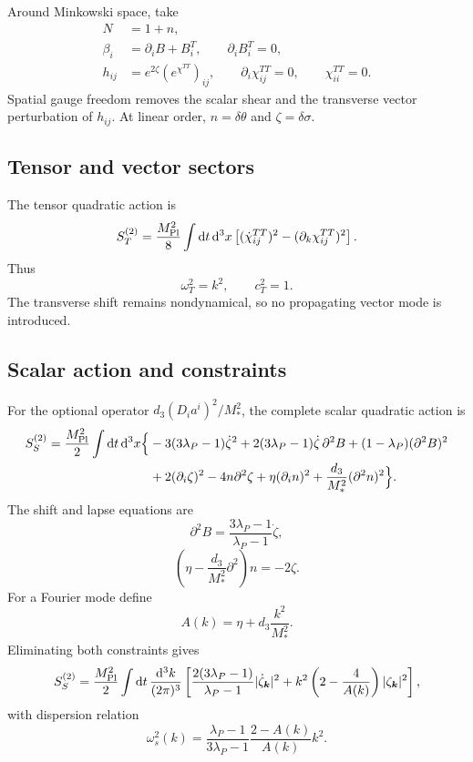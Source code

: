 \documentclass[11pt]{article}
\newcommand{\Mpl}{M_{\rm Pl}}
\newcommand{\Ms}{M_*}
\newcommand{\dd}{\mathrm{d}}
\begin{document}
Around Minkowski space, take
\begin{align}
N&=1+n,\nonumber\\
\beta_i&=\partial_iB+B_i^T,\qquad \partial_iB_i^T=0,\nonumber\\
h_{ij}&=e^{2\zeta}(e^{\chi^{TT}})_{ij},\qquad
\partial_i\chi_{ij}^{TT}=0,\qquad \chi_{ii}^{TT}=0.
\label{eq:decomp}
\end{align}
Spatial gauge freedom removes the scalar shear and the transverse vector perturbation of $h_{ij}$.  At linear order, $n=\delta\theta$ and $\zeta=\delta\sigma$.

\subsection{Tensor and vector sectors}

The tensor quadratic action is
\begin{equation}
S_T^{(2)}=\frac{\Mpl^2}{8}\int \dd t\,\dd^3x
\left[(\dot\chi_{ij}^{TT})^2-(\partial_k\chi_{ij}^{TT})^2\right].
\label{eq:tensorquad}
\end{equation}
Thus
\begin{equation}
\omega_T^2=k^2,
\qquad c_T^2=1.
\end{equation}
The transverse shift remains nondynamical, so no propagating vector mode is introduced.

\subsection{Scalar action and constraints}

For the optional operator $d_3(D_i a^i)^2/\Ms^2$, the complete scalar quadratic action is
\begin{align}
S_S^{(2)}=\frac{\Mpl^2}{2}\int \dd t\,\dd^3x\Big\{&
-3(3\lambda_P-1)\dot\zeta^2
+2(3\lambda_P-1)\dot\zeta\,\partial^2B
+(1-\lambda_P)(\partial^2B)^2
\nonumber\\
&+2(\partial_i\zeta)^2-4n\partial^2\zeta
+\eta(\partial_i n)^2+
\frac{d_3}{\Ms^2}(\partial^2n)^2\Big\}.
\label{eq:scalarquadraw}
\end{align}
The shift and lapse equations are
\begin{equation}
\partial^2B=\frac{3\lambda_P-1}{\lambda_P-1}\dot\zeta,
\label{eq:Blin}
\end{equation}
\begin{equation}
\left(\eta-\frac{d_3}{\Ms^2}\partial^2\right)n=-2\zeta.
\label{eq:nlin}
\end{equation}
For a Fourier mode define
\begin{equation}
A(k)=\eta+d_3\frac{k^2}{\Ms^2}.
\end{equation}
Eliminating both constraints gives
\begin{equation}
S_S^{(2)}=\frac{\Mpl^2}{2}\int \dd t\,\frac{\dd^3k}{(2\pi)^3}
\left[
\frac{2(3\lambda_P-1)}{\lambda_P-1}|\dot\zeta_{\bm k}|^2
+k^2\left(2-\frac{4}{A(k)}\right)|\zeta_{\bm k}|^2
\right],
\label{eq:scalarquadred}
\end{equation}
with dispersion relation
\begin{equation}
\omega_s^2(k)=\frac{\lambda_P-1}{3\lambda_P-1}
\frac{2-A(k)}{A(k)}k^2.
\label{eq:dispersion}
\end{equation}
\end{document}
